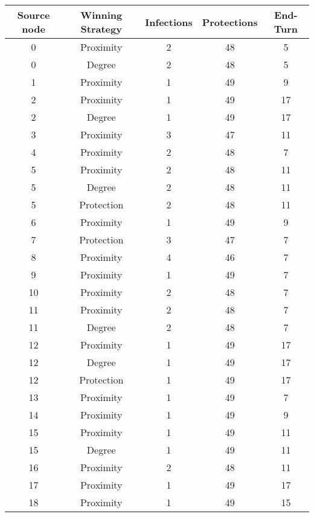 \documentclass[results.tex]{subfiles}
\begin{document}
\begin{center}
  \begin{tabular}{| c || c | c | c | c |}
    \hline
    {\bfseries Source node} & {\bfseries Winning Strategy} & {\bfseries Infections} & {\bfseries Protections} & {\bfseries End-Turn} \\  %
    \hline\hline
    0 & Proximity & 2 & 48 & 5 \\ 
    \hline
    0 & Degree & 2 & 48 & 5 \\ 
    \hline
    1 & Proximity & 1 & 49 & 9 \\ 
    \hline
    2 & Proximity & 1 & 49 & 17 \\ 
    \hline
    2 & Degree & 1 & 49 & 17 \\ 
    \hline
    3 & Proximity & 3 & 47 & 11 \\ 
    \hline
    4 & Proximity & 2 & 48 & 7 \\ 
    \hline
    5 & Proximity & 2 & 48 & 11 \\ 
    \hline
    5 & Degree & 2 & 48 & 11 \\ 
    \hline
    5 & Protection & 2 & 48 & 11 \\ 
    \hline
    6 & Proximity & 1 & 49 & 9 \\ 
    \hline
    7 & Protection & 3 & 47 & 7 \\ 
    \hline
    8 & Proximity & 4 & 46 & 7 \\ 
    \hline
    9 & Proximity & 1 & 49 & 7 \\ 
    \hline
    10 & Proximity & 2 & 48 & 7 \\ 
    \hline
    11 & Proximity & 2 & 48 & 7 \\ 
    \hline
    11 & Degree & 2 & 48 & 7 \\ 
    \hline
    12 & Proximity & 1 & 49 & 17 \\ 
    \hline
    12 & Degree & 1 & 49 & 17 \\ 
    \hline
    12 & Protection & 1 & 49 & 17 \\ 
    \hline
    13 & Proximity & 1 & 49 & 7 \\ 
    \hline
    14 & Proximity & 1 & 49 & 9 \\ 
    \hline
    15 & Proximity & 1 & 49 & 11 \\ 
    \hline
    15 & Degree & 1 & 49 & 11 \\ 
    \hline
    16 & Proximity & 2 & 48 & 11 \\ 
    \hline
    17 & Proximity & 1 & 49 & 17 \\ 
    \hline
    18 & Proximity & 1 & 49 & 15 \\ 

\end{tabular}
\end{center}
\end{document}
